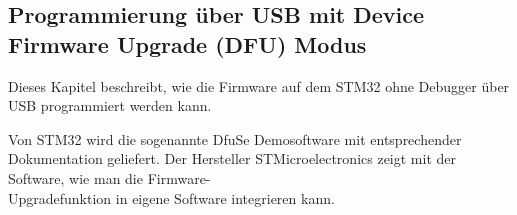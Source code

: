 \subsection{Programmierung über USB mit Device Firmware Upgrade (DFU) Modus}
\label{sec:USBDFU}

Dieses Kapitel beschreibt, wie die Firmware auf dem STM32 ohne Debugger über USB programmiert werden kann.

Von STM32 wird die sogenannte DfuSe Demosoftware mit entsprechender Dokumentation geliefert. 
Der Hersteller STMicroelectronics zeigt mit der Software, wie man die Firmware-\\Upgradefunktion in eigene Software integrieren kann.


